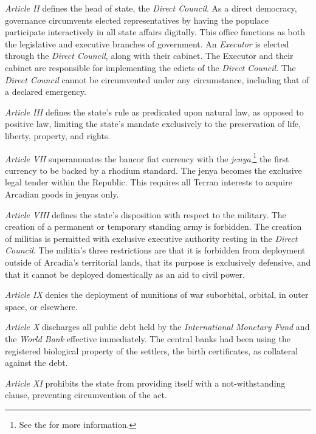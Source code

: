 \item {\it Article II} defines the head of state, the {\it Direct Council}. As a direct democracy, governance circumvents elected representatives by having the populace participate interactively in all state affairs digitally. This office functions as both the legislative and executive branches of government. An {\it Executor} is elected through the {\it Direct Council}, along with their cabinet. The Executor and their cabinet are responsible for implementing the edicts of the {\it Direct Council}. The {\it Direct Council} cannot be circumvented under any circumstance, including that of a declared emergency.

\item {\it Article III} defines the state's rule as predicated upon natural law, as opposed to positive law, limiting the state's mandate exclusively to the preservation of life, liberty, property, and rights.

\item {\it Article VII} superannuates the bancor fiat currency with the {\it jenya},\footnote{See the \about[Jenya] for more information.} the first currency to be backed by a rhodium standard. The jenya becomes the exclusive legal tender within the Republic. This requires all Terran interests to acquire Arcadian goods in jenyas only.

\item {\it Article VIII} defines the state's disposition with respect to the military. The creation of a permanent or temporary standing army is forbidden. The creation of militias is permitted with exclusive executive authority resting in the {\it Direct Council}. The militia's three restrictions are that it is forbidden from deployment outside of Arcadia's territorial lands, that its purpose is exclusively defensive, and that it cannot be deployed domestically as an aid to civil power.

\item {\it Article IX} denies the deployment of munitions of war suborbital, orbital, in outer space, or elsewhere.

\item {\it Article X} discharges all public debt held by the {\it International Monetary Fund} and the {\it World Bank} effective immediately. The central banks had been using the registered biological property of the settlers, the birth certificates, as collateral against the debt.

\item {\it Article XI} prohibits the state from providing itself with a not-withstanding clause, preventing circumvention of the act.
\stopitemize
\stopTimelineDocument

